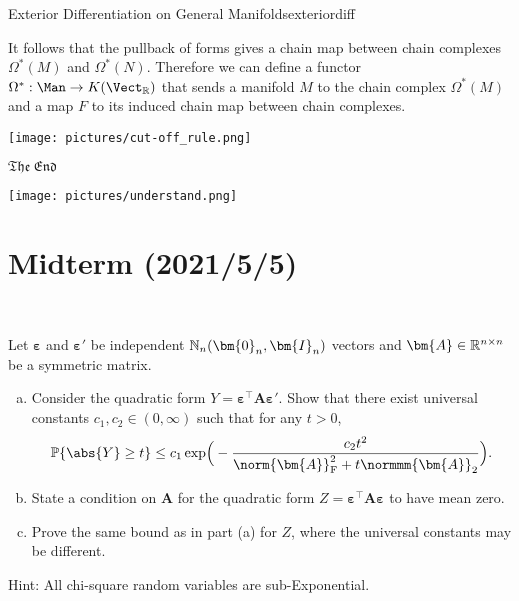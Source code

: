 \documentclass[12pt, a3paper, openany]{book}
\begin{document}
\begin{Remark}{Exterior Differentiation on General Manifolds}{exteriordiff}
\begin{center}
\end{center}
It follows that the pullback of forms gives a chain map between chain complexes $\Omega^*(M)$ and $\Omega^*(N)$. Therefore we can define a functor $\Omega^*:\Man \to K(\Vect_\mathbb{R})$ that sends a manifold $M$ to the chain complex $\Omega^*(M)$ and a map $F$ to its induced chain map between chain complexes.
\end{Remark}
\vspace{2.333ex}
\begin{center}
	\texttt{[image: pictures/cut-off\_rule.png]}
	\vspace{-5ex}
\end{center}
\hfill {\Large $\mathfrak{The\ End}$ \Coffeecup}
\vspace{5.555ex}
\begin{center}
	\texttt{[image: pictures/understand.png]}
\end{center}


\clearpage
\appendix
{}

\section*{\bf Midterm \sf\scriptsize (2021/5/5)}
\begin{Prob}\ 

Let $\bm{\varepsilon}$ and $\bm{\varepsilon}'$ be independent $\N_{n}(\bm{0}_{n},\bm{I}_{n})$ vectors and $\bm{A} \in \R^{n \times n}$ be a symmetric matrix. 
\begin{enumerate}[(a)]
	\setlength{\itemsep}{0pt}
\item Consider the quadratic form $Y = \bm{\varepsilon}^{\top}\bm{A}\bm{\varepsilon}'$. Show that there exist universal constants $c_{1},c_{2} \in (0,\infty)$ such that for any $t > 0$, \vspace{-2ex}
\[ \P\{ \abs{Y} \geq t \} \leq c_{1} \exp\!\Big( - \frac{c_{2}t^{2}}{\norm{\bm{A}}_{\mathrm{F}}^{2}+t\normmm{\bm{A}}_{2}} \Big) . \vspace{-1ex}\] 
\item State a condition on $\bm{A}$ for the quadratic form $Z = \bm{\varepsilon}^{\top}\bm{A}\bm{\varepsilon}$ to have mean zero. 
\item Prove the same bound as in part (a) for $Z$, where the universal constants may be different.
\end{enumerate}
\normalfont Hint: All chi-square random variables are sub-Exponential.
\end{Prob}
\end{document}
